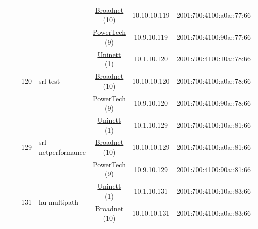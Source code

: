 \begin{small}
\begin{center}
\begin{longtable}{|c|c|c|c|c|c|c|c|}
  &  &  &  & \multicolumn{2}{|c|}{\tiny{\href{https://www.broadnet.no}{Broadnet} (10)}} & \tiny{10.10.10.119} & \tiny{2001:700:4100:a0a::77:66} \\* \cline{5-5}\cline{6-6}\cline{7-7}\cline{8-8}
  &  &  &  & \multicolumn{2}{|c|}{\tiny{\href{http://www.powertech.no}{PowerTech} (9)}} & \tiny{10.9.10.119} & \tiny{2001:700:4100:90a::77:66} \\* \cline{3-3}\cline{4-4}\cline{5-5}\cline{6-6}\cline{7-7}\cline{8-8}
  &  & \multirow{3}{*}{\tiny{120}} & \multicolumn{1}{|l|}{\multirow{3}{*}{\tiny{srl-test}}} & \multicolumn{2}{|c|}{\tiny{\href{https://www.uninett.no}{Uninett} (1)}} & \tiny{10.1.10.120} & \tiny{2001:700:4100:10a::78:66} \\* \cline{5-5}\cline{6-6}\cline{7-7}\cline{8-8}
  &  &  &  & \multicolumn{2}{|c|}{\tiny{\href{https://www.broadnet.no}{Broadnet} (10)}} & \tiny{10.10.10.120} & \tiny{2001:700:4100:a0a::78:66} \\* \cline{5-5}\cline{6-6}\cline{7-7}\cline{8-8}
  &  &  &  & \multicolumn{2}{|c|}{\tiny{\href{http://www.powertech.no}{PowerTech} (9)}} & \tiny{10.9.10.120} & \tiny{2001:700:4100:90a::78:66} \\* \cline{3-3}\cline{4-4}\cline{5-5}\cline{6-6}\cline{7-7}\cline{8-8}
  &  & \multirow{3}{*}{\tiny{129}} & \multicolumn{1}{|l|}{\multirow{3}{*}{\tiny{srl-netperformance}}} & \multicolumn{2}{|c|}{\tiny{\href{https://www.uninett.no}{Uninett} (1)}} & \tiny{10.1.10.129} & \tiny{2001:700:4100:10a::81:66} \\* \cline{5-5}\cline{6-6}\cline{7-7}\cline{8-8}
  &  &  &  & \multicolumn{2}{|c|}{\tiny{\href{https://www.broadnet.no}{Broadnet} (10)}} & \tiny{10.10.10.129} & \tiny{2001:700:4100:a0a::81:66} \\* \cline{5-5}\cline{6-6}\cline{7-7}\cline{8-8}
  &  &  &  & \multicolumn{2}{|c|}{\tiny{\href{http://www.powertech.no}{PowerTech} (9)}} & \tiny{10.9.10.129} & \tiny{2001:700:4100:90a::81:66} \\* \cline{3-3}\cline{4-4}\cline{5-5}\cline{6-6}\cline{7-7}\cline{8-8}
  &  & \multirow{3}{*}{\tiny{131}} & \multicolumn{1}{|l|}{\multirow{3}{*}{\tiny{hu-multipath}}} & \multicolumn{2}{|c|}{\tiny{\href{https://www.uninett.no}{Uninett} (1)}} & \tiny{10.1.10.131} & \tiny{2001:700:4100:10a::83:66} \\* \cline{5-5}\cline{6-6}\cline{7-7}\cline{8-8}
  &  &  &  & \multicolumn{2}{|c|}{\tiny{\href{https://www.broadnet.no}{Broadnet} (10)}} & \tiny{10.10.10.131} & \tiny{2001:700:4100:a0a::83:66} \\* \cline{5-5}\cline{6-6}\cline{7-7}\cline{8-8}

\end{longtable}
\end{center}
\end{small}
